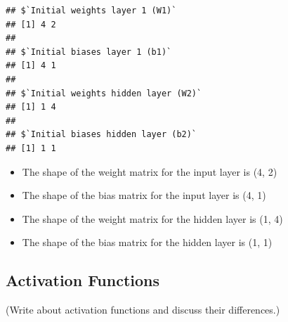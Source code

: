 \documentclass[
]{article}
\providecommand{\tightlist}{%
  \setlength{\itemsep}{0pt}\setlength{\parskip}{0pt}}
\begin{document}
\begin{verbatim}
## $`Initial weights layer 1 (W1)`
## [1] 4 2
## 
## $`Initial biases layer 1 (b1)`
## [1] 4 1
## 
## $`Initial weights hidden layer (W2)`
## [1] 1 4
## 
## $`Initial biases hidden layer (b2)`
## [1] 1 1
\end{verbatim}

\begin{itemize}
\tightlist
\item
  The shape of the weight matrix for the input layer is (4, 2)
\item
  The shape of the bias matrix for the input layer is (4, 1)
\item
  The shape of the weight matrix for the hidden layer is (1, 4)
\item
  The shape of the bias matrix for the hidden layer is (1, 1)
\end{itemize}

\hypertarget{activation-functions}{%
\subsection{Activation Functions}\label{activation-functions}}

(Write about activation functions and discuss their differences.)
\end{document}
